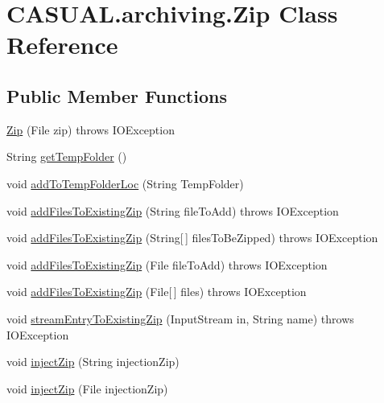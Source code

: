 \hypertarget{class_c_a_s_u_a_l_1_1archiving_1_1_zip}{\section{C\-A\-S\-U\-A\-L.\-archiving.\-Zip Class Reference}
\label{class_c_a_s_u_a_l_1_1archiving_1_1_zip}
}
\subsection*{Public Member Functions}
\begin{DoxyCompactItemize}
\item 
\hyperlink{class_c_a_s_u_a_l_1_1archiving_1_1_zip_af739cb60ce5a0d3a5348cb9e679ceba7}{Zip} (File zip)  throws I\-O\-Exception 
\item 
String \hyperlink{class_c_a_s_u_a_l_1_1archiving_1_1_zip_a0e55040227d73b64d691017a57e88c30}{get\-Temp\-Folder} ()
\item 
void \hyperlink{class_c_a_s_u_a_l_1_1archiving_1_1_zip_aa1bf6893e99618dfc73e5e15d90a233e}{add\-To\-Temp\-Folder\-Loc} (String Temp\-Folder)
\item 
void \hyperlink{class_c_a_s_u_a_l_1_1archiving_1_1_zip_a2a84e31123f657e9c5e6cc73bcf85fc0}{add\-Files\-To\-Existing\-Zip} (String file\-To\-Add)  throws I\-O\-Exception 
\item 
void \hyperlink{class_c_a_s_u_a_l_1_1archiving_1_1_zip_aacdd5cd6f2847e0ee6bb77ea202ecdab}{add\-Files\-To\-Existing\-Zip} (String\mbox{[}$\,$\mbox{]} files\-To\-Be\-Zipped)  throws I\-O\-Exception 
\item 
void \hyperlink{class_c_a_s_u_a_l_1_1archiving_1_1_zip_a9dc2f94fce74e938b6f529cdf300ad91}{add\-Files\-To\-Existing\-Zip} (File file\-To\-Add)  throws I\-O\-Exception 
\item 
void \hyperlink{class_c_a_s_u_a_l_1_1archiving_1_1_zip_afb0e0e812a4fb259b8c4af21ece047ba}{add\-Files\-To\-Existing\-Zip} (File\mbox{[}$\,$\mbox{]} files)  throws I\-O\-Exception 
\item 
void \hyperlink{class_c_a_s_u_a_l_1_1archiving_1_1_zip_a79c5b8d507f0b2207657968ce04d7662}{stream\-Entry\-To\-Existing\-Zip} (Input\-Stream in, String name)  throws I\-O\-Exception 
\item 
void \hyperlink{class_c_a_s_u_a_l_1_1archiving_1_1_zip_afba344b319d35382ac45f0019135f2bb}{inject\-Zip} (String injection\-Zip)
\item 
void \hyperlink{class_c_a_s_u_a_l_1_1archiving_1_1_zip_a793ea3d539a12d8dac7a623f98372cf7}{inject\-Zip} (File injection\-Zip)

\end{DoxyCompactItemize}
